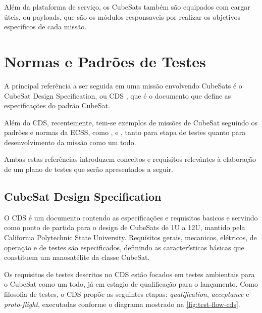 Além da plataforma de serviço, os CubeSats também são equipados com cargar úteis, ou payloads, que são os módulos responsaveis por realizar os objetivos específicos de cada missão.

\section{Normas e Padrões de Testes}\label{sec:normas-ecss}

A principal referência a ser seguida em uma missão envolvendo CubeSats é o CubeSat Design Specification, ou \gls{CDS} \cite{cds}, que é o documento que define as especificações do padrão CubeSat.

Além do \gls{CDS}, recentemente, tem-se exemplos de missões de CubeSat seguindo os padrões e normas da \gls{ECSS}, como \textcite{floripasat-1}, \textcite{tailoring-ecss-nanosat} e \textcite{mist-eps}, tanto para etapa de testes quanto para desenvolvimento da missão como um todo.

Ambas estas referências introduzem conceitos e requisitos relevântes à elaboração de um plano de testes que serão apresentados a seguir.

\subsection{CubeSat Design Specification}

O \gls{CDS} é um documento contendo as especificações e requisitos basicos e servindo como ponto de partida para o design de CubeSats de 1U a 12U, mantido pela California Polytechnic State University.
Requisitos gerais, mecanicos, elétricos, de operação e de testes são especificados, definindo as características básicas que constituem um nanosatélite da classe CubeSat.

Os requisitos de testes descritos no \gls{CDS} estão focados em testes ambientais para o CubeSat como um todo, já em estagio de qualificação para o lançamento.
Como filosofia de testes, o \gls{CDS} propõe as seguintes etapas: \textit{qualification}, \textit{acceptance} e \textit{proto-flight}, executadas conforme o diagrama mostrado na \autoref{fig:test-flow-cds}.

